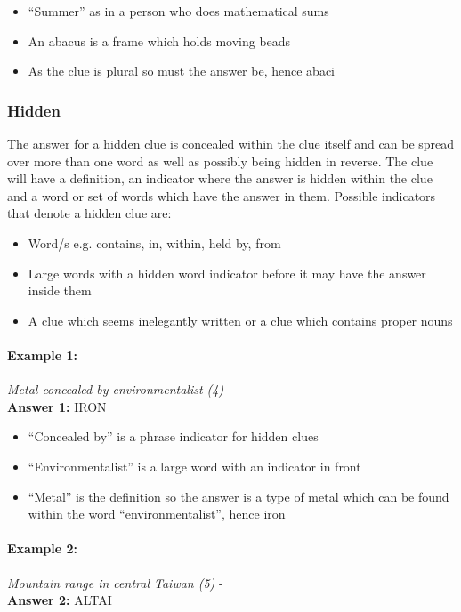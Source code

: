 \begin{itemize}
  \item ``Summer'' as in a person who does mathematical sums 
  \item An abacus is a frame which holds moving beads 
  \item As the clue is plural so must the answer be, hence abaci
\end{itemize}


\subsubsection{Hidden}  

The answer for a hidden clue is concealed within the clue itself and can be
spread over more than one word as well as possibly being hidden in reverse. The
clue will have a definition, an indicator where the answer is hidden within the
clue and a word or set of words which have the answer in them. Possible 
indicators that denote a hidden clue are:

\begin{itemize} 
  \item Word/s e.g. contains, in, within, held by, from 
  \item Large words with a hidden word indicator before it may have the answer 
        inside them 
  \item A clue which seems inelegantly written or a clue which contains proper 
        nouns  
\end{itemize}

\paragraph{Example 1:} \emph{Metal concealed by environmentalist (4)} - \citep{shuchiHidden08} \\
\textbf{Answer 1:} IRON 

\begin{itemize}
  \item ``Concealed by'' is a phrase indicator for hidden clues 
  \item ``Environmentalist'' is a large word with an indicator in front 
  \item ``Metal'' is the definition so the answer is a type of metal which can
        be found within the word ``environmentalist'', hence iron 
\end{itemize}


\paragraph{Example 2:} \emph{Mountain range in central Taiwan (5)} - \citep{shuchiHidden08} \\
\textbf{Answer 2:} ALTAI 

